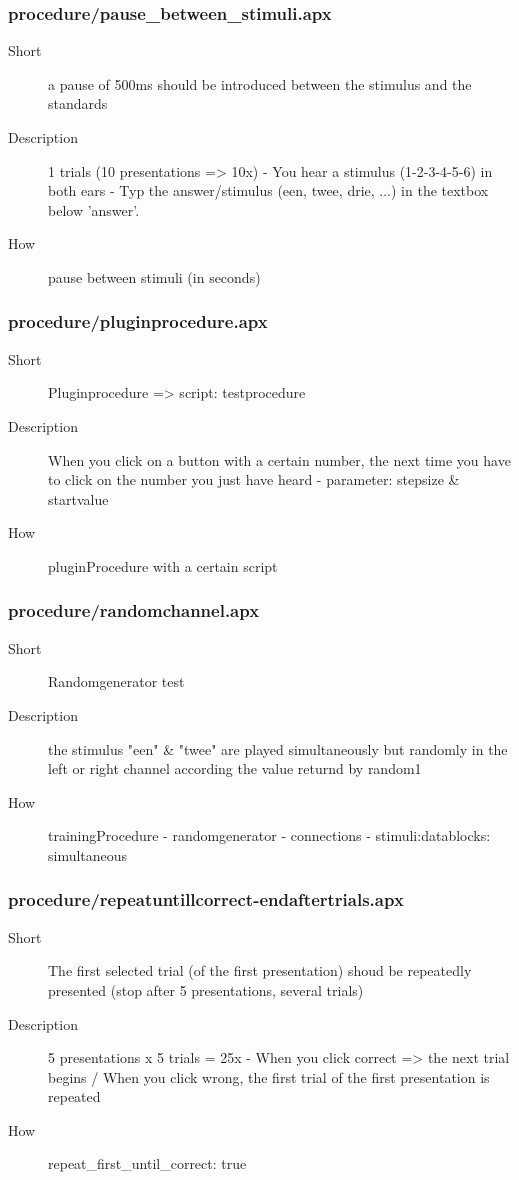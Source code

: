 \subsubsection{procedure/pause\_between\_stimuli.apx}
\begin{description}
\item[Short] 
  a pause of 500ms should be introduced between the stimulus and the standards
\item[Description] 
 1 trials (10 presentations =\textgreater{} 10x) - You hear a stimulus (1-2-3-4-5-6) in both ears - Typ the answer/stimulus (een, twee, drie, ...) in the textbox below 'answer'.
\item[How] 
 pause between stimuli (in seconds)
\end{description}

\subsubsection{procedure/pluginprocedure.apx}
\begin{description}
\item[Short] 
 Pluginprocedure =\textgreater{} script: testprocedure
\item[Description] 
 When you click on a button with a certain number, the next time you have to click on the number you just have heard - parameter: stepsize \& startvalue
\item[How] 
 pluginProcedure with a certain script
\end{description}

\subsubsection{procedure/randomchannel.apx}
\begin{description}
\item[Short] 
 Randomgenerator test
\item[Description] 
 the stimulus "een" \& "twee" are played simultaneously but randomly in the left or right channel according the value returnd by random1
\item[How] 
 trainingProcedure - randomgenerator - connections - stimuli:datablocks: simultaneous
\end{description}

\subsubsection{procedure/repeatuntillcorrect-endaftertrials.apx}
\begin{description}
\item[Short] 
 The first selected trial (of the first presentation) shoud be repeatedly presented (stop after 5 presentations, several trials)
\item[Description] 
 5 presentations x 5 trials = 25x - When you click correct =\textgreater{} the next trial begins / When you click wrong, the first trial of the first presentation is repeated
\item[How] 
 repeat\_first\_until\_correct: true
\end{description}

